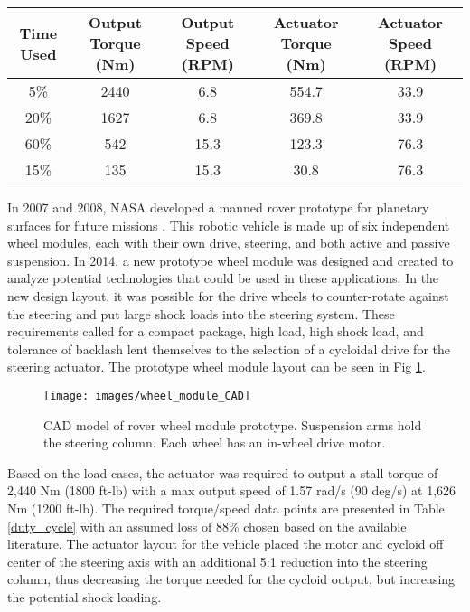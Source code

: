\begin{table*}[t]
  \vskip0.2cm
  \caption{Designed Duty Cycles for System}
  \label{duty_cycle}
  \begin{center}
    \vskip-0.2cm
    \begin{tabular}{|c||c||c| |c| |c|}
    \hline
    Time Used & Output Torque (Nm) & Output Speed (RPM) & Actuator Torque (Nm) & Actuator Speed (RPM)\\
    \hline
    5\% & 2440 & 6.8 & 554.7 & 33.9\\
    \hline
    20\% & 1627 & 6.8 & 369.8 & 33.9\\
    \hline
    60\% & 542 & 15.3 & 123.3 & 76.3\\
    \hline
    15\% & 135 & 15.3 & 30.8 & 76.3\\
    \hline
    \end{tabular}
  \end{center}
\end{table*}

In 2007 and 2008, NASA developed a manned rover prototype for planetary surfaces for future missions \cite{rover}.
This robotic vehicle is made up of six independent wheel modules, each with their own drive, steering, and both active and passive suspension.
In 2014, a new prototype wheel module was designed and created to analyze potential technologies that could be used in these applications.
In the new design layout, it was possible for the drive wheels to counter-rotate against the steering and put large shock loads into the steering system.
These requirements called for a compact package, high load, high shock load, and tolerance of backlash lent themselves to the selection of a cycloidal drive for the steering actuator.
The prototype wheel module layout can be seen in Fig \ref{wheel_module}.

\begin{figure}[t]
   \centering
   \texttt{[image: images/wheel\_module\_CAD]}
   \caption{CAD model of rover wheel module prototype.
   Suspension arms hold the steering column.
   Each wheel has an in-wheel drive motor.}
   \label{wheel_module}
\end{figure}

Based on the load cases, the actuator was required to output a stall torque of 2,440 Nm (1800 ft-lb) with a max output speed of 1.57 rad/s (90 deg/s) at 1,626 Nm (1200 ft-lb).
The required torque/speed data points are presented in Table \ref{duty_cycle} with an assumed loss of 88\% chosen based on the available literature.
The actuator layout for the vehicle placed the motor and cycloid off center of the steering axis with an additional 5:1 reduction into the steering column, thus decreasing the torque needed for the cycloid output, but increasing the potential shock loading.

